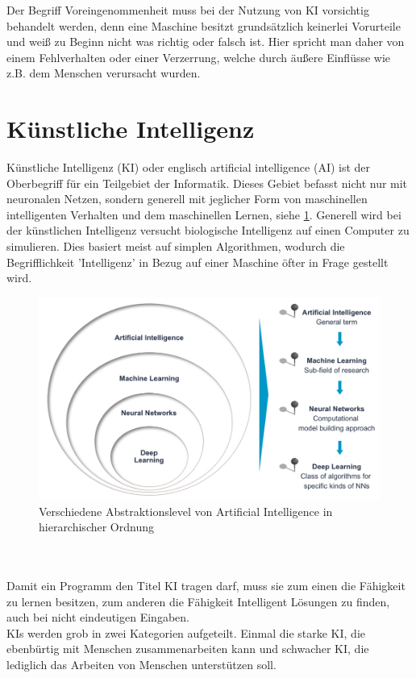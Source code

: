 \documentclass[12pt,oneside,a4paper,parskip]{scrbook}
\begin{document}
Der Begriff Voreingenommenheit muss bei der Nutzung von KI vorsichtig behandelt werden, denn eine Maschine besitzt grundsätzlich keinerlei Vorurteile und weiß zu Beginn nicht was richtig oder falsch ist. Hier spricht man daher von einem Fehlverhalten oder einer Verzerrung, welche durch äußere Einflüsse wie z.B. dem Menschen verursacht wurden.\\

\section{Künstliche Intelligenz}
Künstliche Intelligenz (KI) oder englisch artificial intelligence (AI) ist der Oberbegriff für ein Teilgebiet der Informatik. Dieses Gebiet befasst nicht nur mit neuronalen Netzen, sondern generell mit jeglicher Form von maschinellen intelligenten Verhalten und dem maschinellen Lernen, siehe \ref{fig:Übersicht}. Generell wird bei der künstlichen Intelligenz versucht biologische Intelligenz auf einen Computer zu simulieren. Dies basiert meist auf simplen Algorithmen, wodurch die Begrifflichkeit 'Intelligenz' in Bezug auf einer Maschine öfter in Frage gestellt wird.
\begin{figure}[ht]
	\begin{center}
		\includegraphics[width=14cm]{Bilder/Abstraktionslevel_von_AI.jpg}
		\caption{Verschiedene Abstraktionslevel von Artificial Intelligence in hierarchischer Ordnung}
		\label{fig:Übersicht}
	\end{center}
\end{figure}
\\\\
Damit ein Programm den Titel KI tragen darf, muss sie zum einen die Fähigkeit zu lernen besitzen, zum anderen die Fähigkeit Intelligent Lösungen zu finden, auch bei nicht eindeutigen Eingaben.\\
KIs werden grob in zwei Kategorien aufgeteilt. Einmal die starke KI, die ebenbürtig mit Menschen zusammenarbeiten kann und schwacher KI, die lediglich das Arbeiten von Menschen unterstützen soll.
\end{document}
